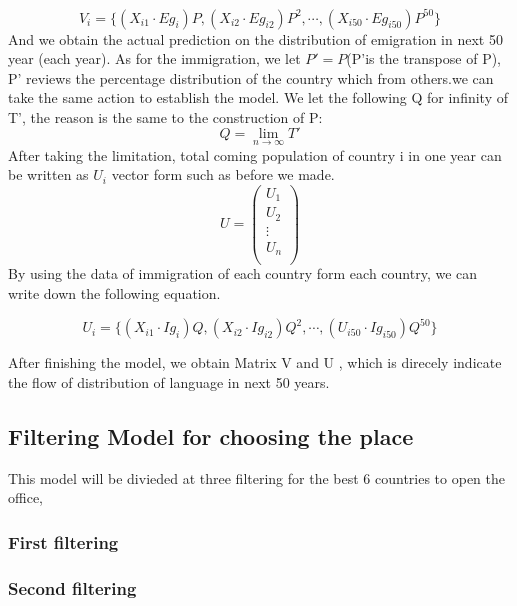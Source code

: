 \documentclass{mcmthesis}
\begin{document}
\begin{equation}
V_i = \{(X_{i1} \cdot Eg_{i})P, (X_{i2} \cdot Eg_{i2})P^2, \cdots, (X_{i 50} \cdot Eg_{i 50})P^{50}\}
\end{equation}
And we obtain the actual prediction on the distribution of emigration in next 50 year (each year).
As for the immigration, 
we let $P'=P $(P'is the transpose of P), P’ reviews the percentage distribution of the country which from others.we can take the same action to establish the model.
We let the following Q for infinity of T', the reason is the same to the construction of P:
\begin{displaymath}
Q=\lim_{n \to \infty} T'
\end{displaymath}
After taking the limitation, total coming population of country i in one year can be written as $U_i$ vector form such as before we made.
\begin{displaymath}
U=\begin{pmatrix}
  {U_{1} }  \\
  {U_{2} }  \\
  {\vdots } \\
  {U_{n} }  \\
  \end{pmatrix}
\end{displaymath}
By using the data of immigration of each country form each country, we can write down the following equation.

\begin{equation}
U_i = \{(X_{i1} \cdot Ig_{i})Q, (X_{i2} \cdot Ig_{i2})Q^2, \cdots, (U_{i 50} \cdot Ig_{i 50})Q^{50}\}
\end{equation}

After finishing the model, we obtain Matrix V and U , which is direcely indicate the flow of distribution of language in next 50 years.

\subsection{Filtering Model for choosing the place }
This model will be divieded at three filtering for the best 6 countries to open the office, 
\subsubsection {First filtering}

\subsubsection {Second filtering}
\end{document}
